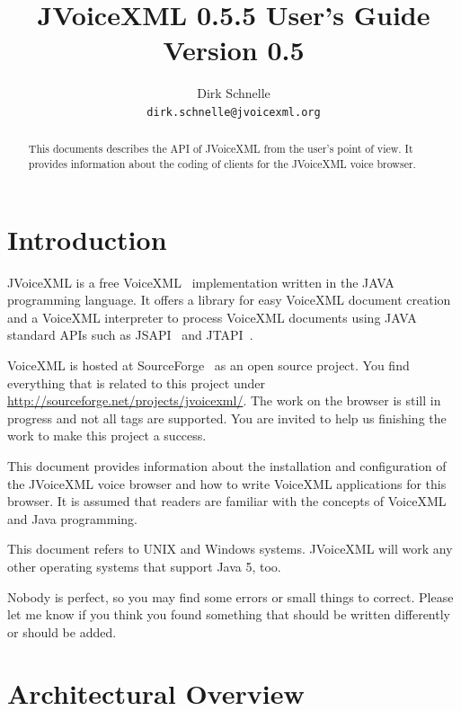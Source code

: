 \documentclass[11pt,a4paper]{article}
\title{JVoiceXML 0.5.5 User's Guide\\
Version 0.5}
\author{Dirk Schnelle \\
  \texttt{dirk.schnelle@jvoicexml.org} }
\date{}
\begin{document}
\pagestyle{headings}

\maketitle

\begin{abstract}
This documents describes the API of JVoiceXML from the user's point of
view. It provides information about the coding of clients for
the JVoiceXML voice browser.
\end{abstract}


\section{Introduction}
\label{sec:introduction}

JVoiceXML is a free VoiceXML~\cite{w3.org:voicexml} implementation written in 
the JAVA programming language. It offers a library for easy VoiceXML
document creation and a VoiceXML interpreter to process 
VoiceXML documents using JAVA standard APIs such as JSAPI~\cite{sun:jsapi} and
JTAPI~\cite{sun:jsapi}.

VoiceXML is hosted at SourceForge~\cite{sourceforge} as an open source project.
You find everything that is related to this project under
\url{http://sourceforge.net/projects/jvoicexml/}.
The work on the browser is still in progress and not all tags are
supported. You are invited to help us finishing the work to make this
project a success.

This document provides information about the installation and
configuration of the JVoiceXML voice browser and how to write
VoiceXML applications for this browser.
It is assumed that readers are familiar with the concepts of
VoiceXML and Java programming.

This document refers to UNIX and Windows systems. JVoiceXML will work 
any other operating systems that support Java 5, too.

Nobody is perfect, so you may find some errors or small things to correct.
Please let me know if you think you found something that should be written
differently or should be added.

\section{Architectural Overview}
\label{sec:arch-overv}
\end{document}
